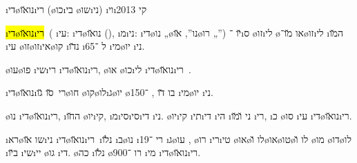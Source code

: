 \newcommand{\dinozaurim}{\i{די}\o{נו}\a{ז}\u{או}\i{רי}\x{ם}}

\textheader%
{\i{די}\o{נו}\u{או}\i{רי}}
{(\o{כו}\i{בי} \o{שו}\i{ני})}
{}
{\i{וי}\i{קי}}
{}
{}
{2013}

\hl{\dinozaurim}\ ( \i{עי}: \i{די}\o{נו}\u{או} (), \i{מ}\i{ני}:  \i{די}\o{נו} „\o{נו}”,  \u{או}\o{רו} „”) \u{יו} ־\i{ס}  \o{זו}\i{לי} \o{או} \u{מו}־\o{זו}\i{לי} \i{ה}\u{מו} \i{עי} \o{זו}\o{זו}\i{אי}\o{קו} \i{נ}\u{דו} \i{ל} ־65 \i{מי}\o{יו} \i{ני}.

\o{עו}\o{פו}   \i{שי}\i{רי}  \dinozaurim, \o{או}  \o{כו}\i{לי}  \dinozaurim\ .

\dinozaurim\ \u{סו} \u{גו}\o{חו} \o{קו}\o{לו}\i{ג}\o{יו} \o{בו}   \u{דו} ,  ־150 \i{מי}\o{יו} \i{ני}.

\o{נו} \dinozaurim, \i{ה}\u{חו} \o{יו}\i{קי}, \i{מ}\i{סי}\i{סי}\i{די} \i{ני}. \o{יו}\i{קי} \i{תי}\i{די} \i{הי} \i{ני} \u{ו}\u{מו} \i{רי}, \i{כ}  \o{סו} \i{עי} \dinozaurim.

\i{רא}\o{שו} \u{או}\i{ני}  \dinozaurim\ \i{נ}\u{לו} \i{ב}\o{נו} \i{רי}   ־19   \i{ג}\o{עו} , \o{רו} \i{רי}\i{טי}  \o{או}\o{לו} \u{ו}\o{או}\o{טו}\o{לו} \u{ו} \o{מו} \o{דו}\o{לו} \i{ב}\u{יו} \i{שי}\i{יי} \o{גו}  \i{די}.
 \o{כה} \i{נ}\u{לו} \o{רו} ־900 \i{מי} \dinozaurim.

